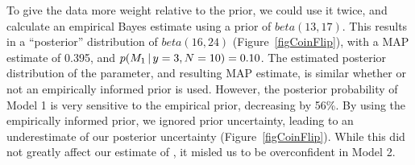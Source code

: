 To give the data more weight relative to the prior, we could use it twice, and
calculate an empirical Bayes estimate using a prior of $beta(13,17)$.  This
results in a ``posterior'' distribution of $beta(16, 24)$
(Figure~\ref{figCoinFlip}), with a MAP estimate of 0.395, and $p(M_1 \,|\,
y=3, N=10) = 0.10$.
The estimated posterior distribution of the parameter, and resulting MAP
estimate, is similar whether or not an empirically informed prior is used.
However, the posterior probability of Model 1 is very sensitive to the
empirical prior, decreasing by 56\%.
By using the empirically informed prior, we ignored prior uncertainty, leading
to an underestimate of our posterior uncertainty (Figure~\ref{figCoinFlip}).
While this did not greatly affect our estimate of \myTheta{}, it misled us
to be overconfident in Model 2.




